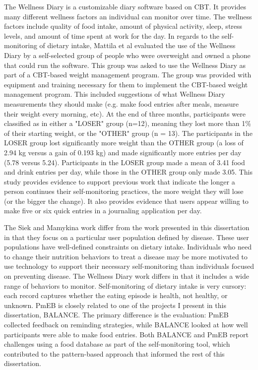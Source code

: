 The Wellness Diary \citep{mattila_mobile_2008, ahtinen_user_2009, mattila_nuadu_2008, koskinen_customizable_2007, van_gils_feasibility_2001} is a  customizable diary software based on CBT. It provides many different wellness factors an individual can monitor over time. The wellness factors include quality of food intake, amount of physical activity, sleep, stress levels, and amount of time spent at work for the day. In regards to the self-monitoring of dietary intake, Mattila et al evaluated the use of the Wellness Diary by a self-selected group of people who were overweight and owned a phone that could run the software. This group was asked to use the Wellness Diary as part of a CBT-based weight management program. The group was provided with equipment and training necessary for them to implement the CBT-based weight management program. This included suggestions of what Wellness Diary measurements they should make (e.g. make food entries after meals, measure their weight every morning, etc). At the end of three months, participants were classified as in either a "LOSER" group (n=12), meaning they lost more than 1\% of their starting weight, or the "OTHER" group (n = 13). The participants in the LOSER group lost significantly more weight than the OTHER group (a loss of 2.94 kg versus a gain of 0.193 kg) and made significantly more entries per day (5.78 versus 5.24). Participants in the LOSER group made a mean of 3.41 food and drink entries per day, while those in the OTHER group only made 3.05. This study provides evidence to support previous work that indicate the longer a person continues their self-monitoring practices, the more weight they will lose (or the bigger the change). It also provides evidence that users appear willing to make five or six quick entries in a journaling application per day. 

The Siek and Mamykina work differ from the work presented in this dissertation in that they focus on a particular user population defined by disease. These user populations have well-defined constraints on dietary intake. Individuals who need to change their nutrition behaviors to treat a disease may be more motivated to use technology to support their necessary self-monitoring than individuals focused on preventing disease. The Wellness Diary work differs in that it includes a wide range of behaviors to monitor. Self-monitoring of dietary intake is very cursory: each record captures whether the eating episode is health, not healthy, or unknown. PmEB is closely related to one of the projects I present in this dissertation, BALANCE. The primary difference is the evaluation: PmEB collected feedback on reminding strategies, while BALANCE looked at how well participants were able to make food entries. Both BALANCE and PmEB report challenges using a food database as part of the self-monitoring tool, which contributed to the pattern-based approach that informed the rest of this dissertation. 


